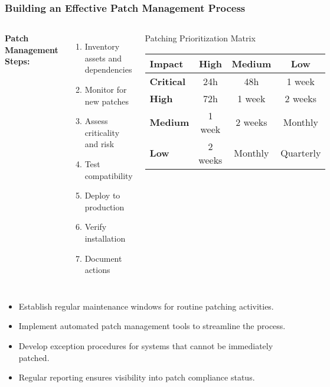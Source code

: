 \documentclass{beamer}
\begin{document}
    \begin{frame}
    \frametitle{Building an Effective Patch Management Process}
    
    \begin{columns}[T]
    \textbf{Patch Management Steps:}
    \begin{enumerate}
    \item Inventory assets and dependencies
    \item Monitor for new patches
    \item Assess criticality and risk
    \item Test compatibility
    \item Deploy to production
    \item Verify installation
    \item Document actions
    \end{enumerate}
    
    \begin{exampleblock}{Patching Prioritization Matrix}
    \scriptsize
    \begin{tabular}{|l|c|c|c|}
    \hline
    \textbf{Impact} & \textbf{High} & \textbf{Medium} & \textbf{Low} \\
    \hline
    \textbf{Critical} & 24h & 48h & 1 week \\
    \hline
    \textbf{High} & 72h & 1 week & 2 weeks \\
    \hline
    \textbf{Medium} & 1 week & 2 weeks & Monthly \\
    \hline
    \textbf{Low} & 2 weeks & Monthly & Quarterly \\
    \hline
    \end{tabular}
    \normalsize
    \end{exampleblock}
    \end{columns}
    
    \vspace{0.3cm}
    \begin{itemize}
    \item Establish regular maintenance windows for routine patching activities.
    \item Implement automated patch management tools to streamline the process.
    \item Develop exception procedures for systems that cannot be immediately patched.
    \item Regular reporting ensures visibility into patch compliance status.
    \end{itemize}
    \end{frame}
\end{document}
